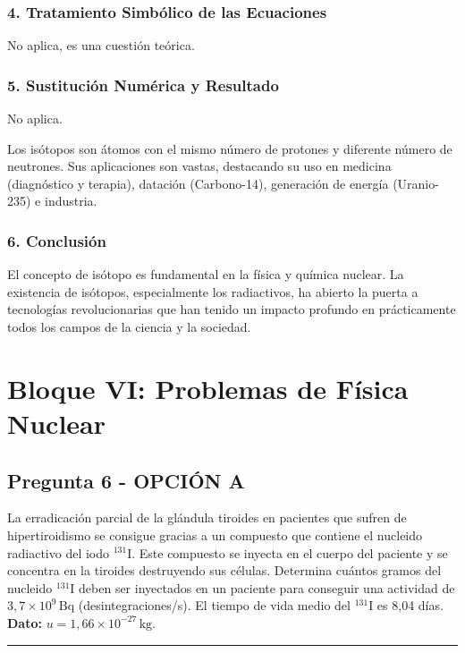 \subsubsection*{4. Tratamiento Simbólico de las Ecuaciones}
No aplica, es una cuestión teórica.

\subsubsection*{5. Sustitución Numérica y Resultado}
No aplica.
\begin{cajaresultado}
Los isótopos son átomos con el mismo número de protones y diferente número de neutrones. Sus aplicaciones son vastas, destacando su uso en medicina (diagnóstico y terapia), datación (Carbono-14), generación de energía (Uranio-235) e industria.
\end{cajaresultado}

\subsubsection*{6. Conclusión}
\begin{cajaconclusion}
El concepto de isótopo es fundamental en la física y química nuclear. La existencia de isótopos, especialmente los radiactivos, ha abierto la puerta a tecnologías revolucionarias que han tenido un impacto profundo en prácticamente todos los campos de la ciencia y la sociedad.
\end{cajaconclusion}

\newpage

\section{Bloque VI: Problemas de Física Nuclear}
\label{sec:nuclear_2002_sep_ext}

\subsection{Pregunta 6 - OPCIÓN A}
\label{subsec:6A_2002_sep_ext}

\begin{cajaenunciado}
La erradicación parcial de la glándula tiroides en pacientes que sufren de hipertiroidismo se consigue gracias a un compuesto que contiene el nucleido radiactivo del iodo ${}^{131}\text{I}$. Este compuesto se inyecta en el cuerpo del paciente y se concentra en la tiroides destruyendo sus células. Determina cuántos gramos del nucleido ${}^{131}\text{I}$ deben ser inyectados en un paciente para conseguir una actividad de $3,7\times10^9\,\text{Bq}$ (desintegraciones/s). El tiempo de vida medio del ${}^{131}\text{I}$ es 8,04 días.
\textbf{Dato:} $u=1,66\times10^{-27}\,\text{kg}$.
\end{cajaenunciado}
\hrule

